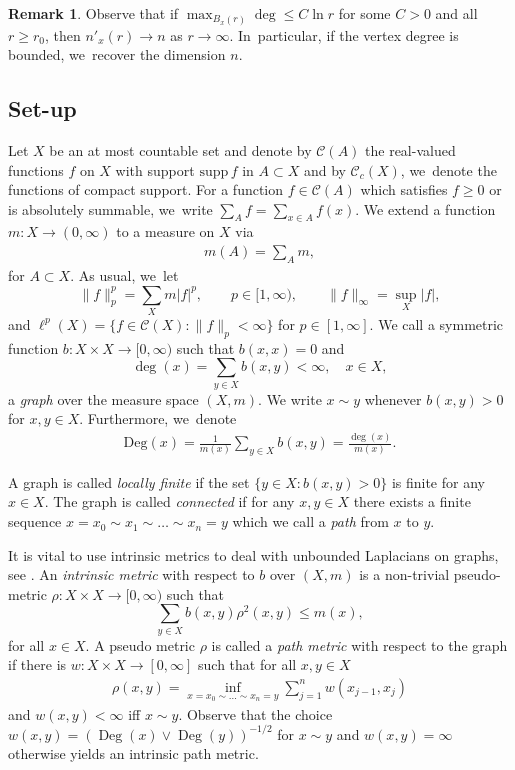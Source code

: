 \documentclass[10pt]{amsart}
\theoremstyle{plain}
\theoremstyle{definition}
\newtheorem*{remark}{Remark}
\newcommand{\cC}{\mathcal{C}}
\DeclareMathOperator{\Deg}{Deg}
\begin{document}
\begin{remark}
Observe that if $\max_{B_x(r)}\deg\leq C\ln r$ for some $C>0$ and all $r\geq r_0$, then $n'_x(r)\to n$ as $r\to\infty$. In~particular, if the vertex degree is bounded, we~recover the dimension $n$.
\end{remark}

\subsection{Set-up}\label{subsec:setup}

Let $X$ be an at most countable set and denote by $ \mathcal{C}(A) $ the real-valued functions $ f $ on $ X $ with support $ \mathrm{supp}\, f $ in $ A \subset X $ and by $ \mathcal{C}_{c}(X) $, we~denote the functions of compact support. {For a function $ f\in \mathcal{C}(A) $ which satisfies $ f\ge 0 $ or is absolutely summable, we~write $ \sum_{A}f=\sum_{x\in A}f(x) $.}
We extend a function
$m\colon X\to(0,\infty)$ to a measure on $X$ via \begin{align*}
m(A)=\sum_{A}m,
\end{align*} for $A\subset X$. {As usual, we~let
\[
\|f\|_p^p= {\sum_{X}m|f|^p},\qquad p\in[1,\infty),\qquad \|f\|_\infty=\sup_X|f|,
\]
and $\ell^p(X)=\{f\in \cC(X)\colon \|f\|_p<\infty\}$ for $p\in[1,\infty]$.}
We call a symmetric function $b\colon X\times X\to [0,\infty)$ such that $b(x,x)=0$ and
\[
\deg(x)=\sum_{y\in X}b(x,y)<\infty, \quad x\in X,
\]
a \emph{graph} over the measure space $(X,m)$. {We write $ x\sim y $ whenever $ b(x,y)>0 $ for $ x,y\in X $.} Furthermore, we~denote
\begin{align*}
\mathrm{Deg}(x)=\frac{1}{m(x)}\sum_{y\in X}b(x,y)=\frac{\deg(x)}{m(x)}.
\end{align*}

A graph is called \emph{locally finite} if the set $\{y\in X\colon b(x,y)>0\}$ is finite for any $x\in X$. The graph is called \emph{connected} if for any $x,y\in X$ there exists a finite sequence {$x=x_0\sim x_1\sim \ldots\sim x_n=y$ which we call a \emph{path} from $ x $ to $ y $.}

It is vital to use intrinsic metrics to deal with unbounded Laplacians on graphs, see \cite{Davies-93a,Folz-11,GrigoryanHuangMasamune-12,BauerKH-13, HaeselerKW-13, Folz-14b, Folz-14, BauerKW-15,Keller-15, HuangKS-20, KellerLW-21}.
An \emph{intrinsic metric} with respect to $b$ over $(X,m)$ is a non-trivial pseudo-metric $\rho\colon X\times X\to[0,\infty)$ such that
\[
\sum_{y\in X} b(x,y)\rho^2(x,y)\leq m(x),
\]
for all $ x\in X $.
A pseudo metric $ \rho $ is called a \emph{path metric} with {respect to the graph} if there is $ w: X\times X\to [0,\infty] $ such that for all $ x,y\in X $
\begin{align*}
\rho (x,y)=\inf_{x=x_{0}\sim \ldots\sim x_{n}=y}\sum_{j=1}^{n}w(x_{j-1},x_{j})
\end{align*}
{and $w(x,y)<\infty $ iff $ x\sim y $.}
Observe that the choice $ w(x,y)=(\Deg(x)\vee\Deg(y))^{-1/2} $ for $ x\sim y $ and $ w(x,y) =\infty$ otherwise yields an intrinsic path metric.
\end{document}
